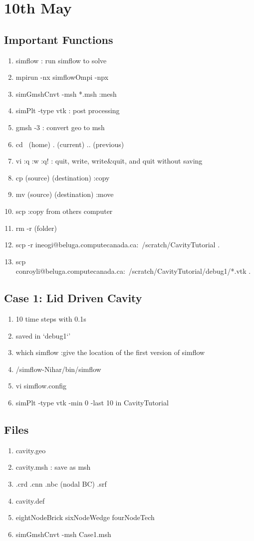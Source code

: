 \documentclass[12pt]{article} %
\begin{document}
\section{10th May}
\subsection{Important Functions}
\begin{enumerate}
    \item simflow : run simflow to solve
    \item mpirun -nx simflowOmpi -npx
    \item simGmshCnvt -msh *.msh :mesh
    \item simPlt -type vtk : post processing
    \item gmsh -3 : convert geo to msh
    \item cd ~(home) . (current) .. (previous)
    \item vi :q :w :q! : quit, write, write\&quit, and quit without saving
    \item cp (source) (destination) :copy
    \item mv (source) (destination) :move
    \item scp :copy from others computer
    \item rm -r (folder)
    \item scp -r ineogi@beluga.computecanada.ca:~/scratch/CavityTutorial .
    \item scp conroyli@beluga.computecanada.ca:~/scratch/CavityTutorial/debug1/*.vtk .
\end{enumerate}
\subsection{Case 1: Lid Driven Cavity}
\begin{enumerate}
    \item 10 time steps with 0.1s
    \item saved in `debug1`'
    \item which simflow :give the location of the first version of simflow
    \item /simflow-Nihar/bin/simflow
    \item vi simflow.config
    \item simPlt -type vtk -min 0 -last 10 in CavityTutorial
\end{enumerate}
    \subsection{Files}
    \begin{enumerate} 
        \item cavity.geo
        \item cavity.msh : save as msh
        \item .crd .cnn .nbc (nodal BC) .srf
        \item cavity.def
        \item eightNodeBrick sixNodeWedge fourNodeTech
        \item simGmshCnvt -msh Case1.msh
\end{enumerate}
\end{document}
